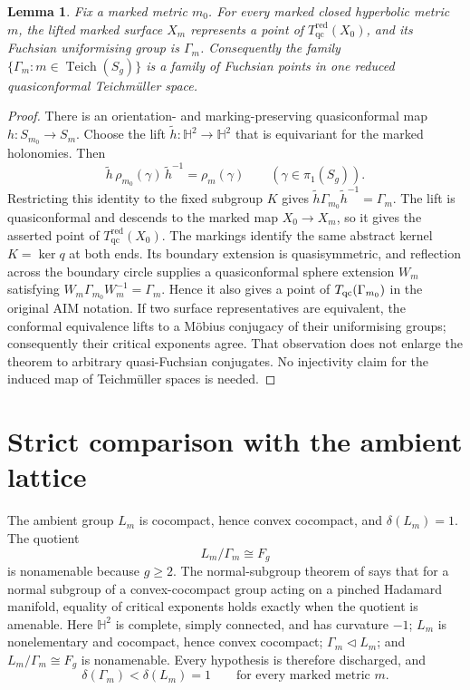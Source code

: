 \documentclass[11pt]{article}
\newtheorem{lemma}[theorem]{Lemma}
\theoremstyle{definition}
\newcommand{\Hh}{\mathbb H^2}
\newcommand{\Tqcred}{T_{\mathrm{qc}}^{\mathrm{red}}}
\begin{document}
\begin{lemma}\label{lem:qc}
Fix a marked metric $m_0$.  For every marked closed hyperbolic metric $m$,
the lifted marked surface $X_m$ represents a point of $\Tqcred(X_0)$, and its
Fuchsian uniformising group is $\Gamma_m$.  Consequently the family
$\{\Gamma_m:m\in\operatorname{Teich}(S_g)\}$ is a family of Fuchsian points in
one reduced quasiconformal Teichm\"uller space.
\end{lemma}

\begin{proof}
There is an orientation- and marking-preserving quasiconformal map
$h:S_{m_0}\to S_m$.  Choose the lift
$\widetilde h:\Hh\to\Hh$ that is equivariant for the marked holonomies.  Then
\[
 \widetilde h\,\rho_{m_0}(\gamma)\,\widetilde h^{-1}
   =\rho_m(\gamma)\qquad(\gamma\in\pi_1(S_g)).
\]
Restricting this identity to the fixed subgroup $K$ gives
$\widetilde h\Gamma_{m_0}\widetilde h^{-1}=\Gamma_m$.  The lift is
quasiconformal and descends to the marked map $X_0\to X_m$, so it gives the
asserted point of $\Tqcred(X_0)$.  The markings identify the same abstract
kernel $K=\ker q$ at both ends.  Its boundary extension is quasisymmetric,
and reflection across the boundary circle supplies a quasiconformal sphere
extension $W_m$ satisfying
$W_m\Gamma_{m_0}W_m^{-1}=\Gamma_m$.  Hence it also gives a point of
$T_{\rm qc}(\Gamma_{m_0})$ in the original AIM notation.  If two surface
representatives are equivalent, the conformal equivalence lifts to a M\"obius
conjugacy of their uniformising groups; consequently their critical exponents
agree.  That observation
does not enlarge the theorem to arbitrary quasi-Fuchsian conjugates.  No
injectivity claim for the induced map of Teichm\"uller spaces is needed.
\end{proof}

\section{Strict comparison with the ambient lattice}

The ambient group $L_m$ is cocompact, hence convex cocompact, and
$\delta(L_m)=1$.  The quotient
\[
 L_m/\Gamma_m\cong F_g
\]
is nonamenable because $g\ge2$.  The normal-subgroup theorem of
\citet[Theorem~1.1]{DougallSharp2016} says that for a normal subgroup of a
convex-cocompact group acting on a pinched Hadamard manifold, equality of
critical exponents holds exactly when the quotient is amenable.  Here
$\Hh$ is complete, simply connected, and has curvature $-1$; $L_m$ is
nonelementary and cocompact, hence convex cocompact; $\Gamma_m\triangleleft
L_m$; and $L_m/\Gamma_m\cong F_g$ is nonamenable.  Every hypothesis is
therefore discharged, and
\begin{equation}\label{eq:strict}
 \delta(\Gamma_m)<\delta(L_m)=1
 \qquad\text{for every marked metric }m.
\end{equation}
\end{document}
